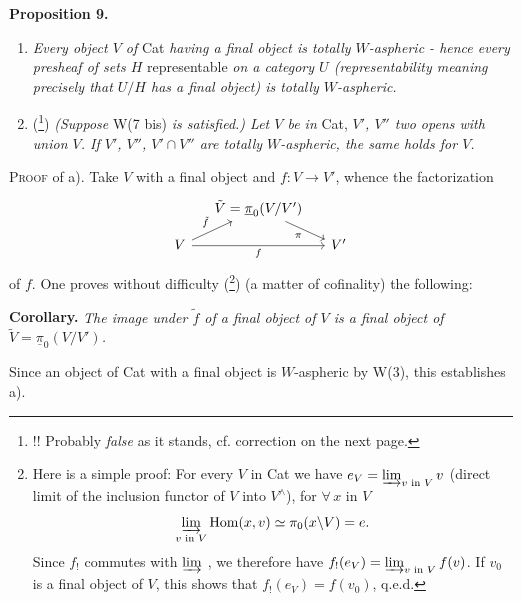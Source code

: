\documentclass[11pt]{article}
\newcommand{\printedpage}[1]{\marginpar{\footnotesize p.~#1}}
\newcommand{\upi}{\underline{\pi}}
\newcommand{\Hom}{\operatorname{Hom}}
\begin{document}
\setcounter{footnote}{65}

\printedpage{68}

\noindent\textbf{Proposition 9.}

\begin{enumerate}[label=\textit{\alph*)}]
\item \textit{Every object $V$ of} Cat \textit{having a final object is totally $W$-aspheric - hence every presheaf of sets $H$} representable \textit{on a category $U$ (representability meaning precisely that $U/H$ has a final object) is totally $W$-aspheric.}

\item (\footnote{!! Probably \textit{false} as it stands, cf. correction on the next page.}) \textit{(Suppose} W(7 bis) \textit{is satisfied.) Let $V$ be in} Cat, \textit{$V'$, $V''$ two opens with union $V$. If $V'$, $V''$, $V'\cap V''$ are totally $W$-aspheric, the same holds for $V$.}
\end{enumerate}

\noindent\textsc{Proof} of a). Take $V$ with a final object and $f : V \longrightarrow V'$, whence the factorization
\[
\begin{tikzcd}[column sep=small, row sep=small]
 & \tilde{V} = \upi_0(V/V') \arrow[dr, "\pi"'] & \\
V \arrow[ur, "\tilde{f}"] \arrow[rr, "f"'] & & V'
\end{tikzcd}
\]
of $f$. One proves without difficulty (\footnote{Here is a simple proof: For every $V$ in Cat we have $e_V = \varinjlim_{v \text{ in } V} v$ (direct limit of the inclusion functor of $V$ into $V^\wedge$), for $\forall\, x$ in $V$
\[
\varinjlim_{v \text{ in } V} \Hom(x,v) \simeq \pi_0(x\backslash V) = e.
\]
Since $f_!$ commutes with $\varinjlim$ , we therefore have $f_!(e_V) = \varinjlim_{v \text{ in } V} f(v)$. If $v_0$ is a final object of $V$, this shows that $f_!(e_V) = f(v_0)$, q.e.d.}) (a matter of cofinality) the following:

\noindent\textbf{Corollary.} \textit{The image under $\tilde{f}$ of a final object of $V$ is a final object of $\tilde{V} = \upi_0(V/V')$.}

Since an object of Cat with a final object is $W$-aspheric by W(3), this establishes a).
\end{document}
